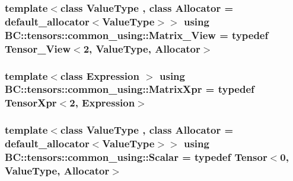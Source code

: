 \subsubsection[{\texorpdfstring{Matrix\+\_\+\+View}{Matrix_View}}]{\setlength{\rightskip}{0pt plus 5cm}template$<$class Value\+Type , class Allocator  = default\+\_\+allocator$<$\+Value\+Type$>$$>$ using {\bf B\+C\+::tensors\+::common\+\_\+using\+::\+Matrix\+\_\+\+View} = typedef {\bf Tensor\+\_\+\+View}$<$2, Value\+Type, {\bf Allocator}$>$}\hypertarget{namespaceBC_1_1tensors_1_1common__using_a2ef3cf5721d0ae966c30051cbe6f24b6}{}\label{namespaceBC_1_1tensors_1_1common__using_a2ef3cf5721d0ae966c30051cbe6f24b6}
\subsubsection[{\texorpdfstring{Matrix\+Xpr}{MatrixXpr}}]{\setlength{\rightskip}{0pt plus 5cm}template$<$class Expression $>$ using {\bf B\+C\+::tensors\+::common\+\_\+using\+::\+Matrix\+Xpr} = typedef {\bf Tensor\+Xpr}$<$2, Expression$>$}\hypertarget{namespaceBC_1_1tensors_1_1common__using_ab190d78daaf06c9290b6dd7d6e1a2bdf}{}\label{namespaceBC_1_1tensors_1_1common__using_ab190d78daaf06c9290b6dd7d6e1a2bdf}
\subsubsection[{\texorpdfstring{Scalar}{Scalar}}]{\setlength{\rightskip}{0pt plus 5cm}template$<$class Value\+Type , class Allocator  = default\+\_\+allocator$<$\+Value\+Type$>$$>$ using {\bf B\+C\+::tensors\+::common\+\_\+using\+::\+Scalar} = typedef {\bf Tensor}$<$0, Value\+Type, {\bf Allocator}$>$}\hypertarget{namespaceBC_1_1tensors_1_1common__using_a22de9a173f6aa6b07a3b4f543c9ad5c1}{}\label{namespaceBC_1_1tensors_1_1common__using_a22de9a173f6aa6b07a3b4f543c9ad5c1}
